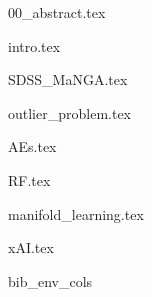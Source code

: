 \documentclass[letterpaper, 12pt]{article}
\begin{document}
  {00_abstract.tex}

  {intro.tex}
  
  {SDSS_MaNGA.tex}
  
  {outlier_problem.tex}
  
  {AEs.tex}

  {RF.tex}

  {manifold_learning.tex}

  {xAI.tex}
  
  \clearpage
  \newpage

  {bib_env_cols}

  \scriptsize
  
\end{document}
